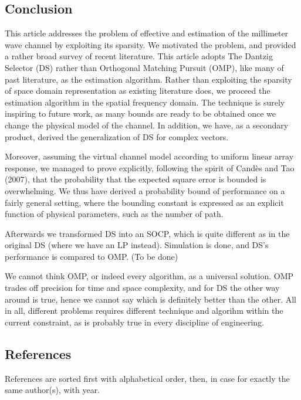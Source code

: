 
\subsection{Conclusion}

This article addresses the problem of effective and estimation of the millimeter wave channel by exploiting its sparsity.
We motivated the problem, and provided a rather broad survey of recent literature.
This article adopts The Dantzig Selector (DS) rather than Orthogonal Matching Pursuit (OMP), like many of past literature, as the estimation algorithm.
Rather than exploiting the sparsity of space domain representation as existing literature does, we proceed the estimation algorithm in the spatial frequency domain.
The technique is surely inspiring to future work, as many bounds are ready to be obtained once we change the physical model of the channel.
In addition, we have, as a secondary product, derived the generalization of DS for complex vectors.

Moreover, assuming the virtual channel model according to uniform linear array response, we managed to prove explicitly, following the spirit of Cand\`es and Tao (2007), that the probability that the expected square error is bounded is overwhelming.
We thus have derived a probability bound of performance on a fairly general setting, where the bounding constant is expressed as an explicit function of physical parameters, such as the number of path.

Afterwards we transformed DS into an SOCP, which is quite different as in the original DS (where we have an LP instead).
Simulation is done, and DS's performance is compared to OMP.
{ \color{red} (To be done) }

We cannot think OMP, or indeed every algorithm, as a universal solution.
OMP trades off precision for time and space complexity, and for DS the other way around is true, hence we cannot say which is definitely better than the other.
All in all, different problems requires different technique and algorihm within the current constraint, as is probably true in every discipline of engineering.

\subsection{References}

References are sorted first with alphabetical order, then, in case for exactly the same author(s), with year.

